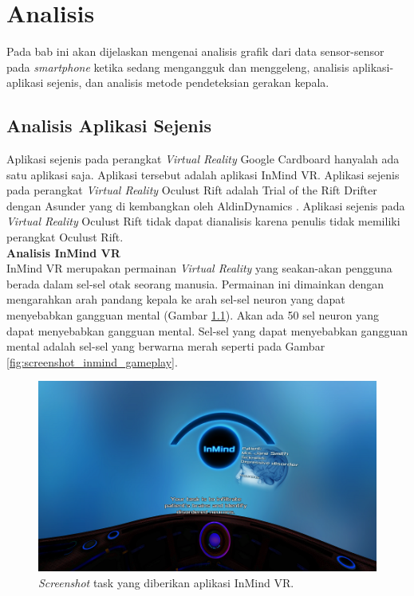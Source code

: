 \chapter{Analisis}
\label{chap:analisis}

Pada bab ini akan dijelaskan mengenai analisis grafik dari data sensor-sensor pada \textit{smartphone} ketika sedang mengangguk dan menggeleng, analisis aplikasi-aplikasi sejenis, dan analisis metode pendeteksian gerakan kepala. 

\section{Analisis Aplikasi Sejenis}
\label{sec:analisis_aplikasi_sejenis}

Aplikasi sejenis pada perangkat \textit{Virtual Reality} Google Cardboard hanyalah ada satu aplikasi saja. Aplikasi tersebut adalah aplikasi InMind VR. Aplikasi sejenis pada perangkat \textit{Virtual Reality} Oculust Rift adalah Trial of the Rift Drifter dengan Asunder yang di kembangkan oleh AldinDynamics \cite{aldin_dynamics}. Aplikasi sejenis pada \textit{Virtual Reality} Oculust Rift tidak dapat dianalisis karena penulis tidak memiliki perangkat Oculust Rift. \\

\textbf{Analisis InMind VR}\\

InMind VR merupakan permainan \textit{Virtual Reality} yang seakan-akan pengguna berada dalam sel-sel otak seorang manusia. Permainan ini dimainkan dengan mengarahkan arah pandang kepala ke arah sel-sel neuron yang dapat menyebabkan gangguan mental (Gambar \ref{fig:screenshot_inmind_task}). Akan ada 50 sel neuron yang dapat menyebabkan gangguan mental. Sel-sel yang dapat menyebabkan gangguan mental adalah sel-sel yang berwarna merah seperti pada Gambar \ref{fig:screenshot_inmind_gameplay}.

\begin{figure}[htbp]
\centering
\includegraphics[scale=0.6]{Gambar/screenshot-inmind-task.png}
\caption{\textit{Screenshot} task yang diberikan aplikasi InMind VR.}
\label{fig:screenshot_inmind_task}
\end{figure}

